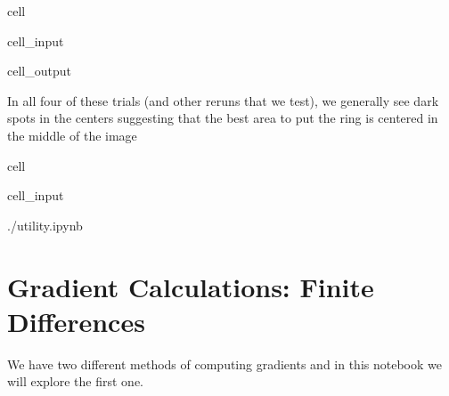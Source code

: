 \documentclass[letterpaper,10pt,english]{jupyterBook}
\begin{document}
\begin{sphinxuseclass}{cell}\begin{sphinxVerbatimInput}

\begin{sphinxuseclass}{cell_input}
\begin{sphinxVerbatim}[commandchars=\\\{\}]
   
  
\end{sphinxVerbatim}

\end{sphinxuseclass}\end{sphinxVerbatimInput}
\begin{sphinxVerbatimOutput}

\begin{sphinxuseclass}{cell_output}
\noindent{}

\end{sphinxuseclass}\end{sphinxVerbatimOutput}

\end{sphinxuseclass}
\sphinxAtStartPar
In all four of these trials (and other reruns that we test), we generally see dark spots in the centers suggesting that the best area to put the ring is centered in the middle of the image

\sphinxstepscope

\begin{sphinxuseclass}{cell}\begin{sphinxVerbatimInput}

\begin{sphinxuseclass}{cell_input}
\begin{sphinxVerbatim}[commandchars=\\\{\}]
 ./utility.ipynb
\end{sphinxVerbatim}

\end{sphinxuseclass}\end{sphinxVerbatimInput}

\end{sphinxuseclass}

\chapter{Gradient Calculations: Finite Differences}
\label{\detokenize{finite_gradient:gradient-calculations-finite-differences}}\label{\detokenize{finite_gradient::doc}}
\sphinxAtStartPar
We have two different methods of computing gradients and in this notebook we will explore the first one.
\end{document}
